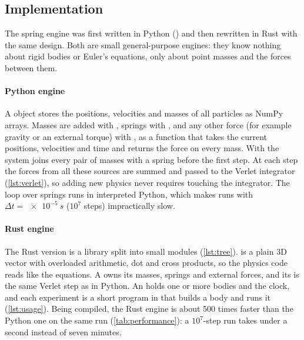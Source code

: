 \subsection{Implementation}
\label{sec:implementation}
\begin{sloppypar} %
The spring engine was first written in Python () and then rewritten in Rust with the same design.
Both are small general-purpose engines: they know nothing about rigid bodies or Euler's equations, only about point masses and the forces between them.

\paragraph{Python engine}
A  object stores the positions, velocities and masses of all particles as NumPy arrays.
Masses are added with , springs with , and any other force (for example gravity or an external torque) with , as a function that takes the current positions, velocities and time and returns the force on every mass.
With  the system joins every pair of masses with a spring before the first step.
At each step the forces from all these sources are summed and passed to the Verlet integrator (\cref{lst:verlet}), so adding new physics never requires touching the integrator.
The loop over springs runs in interpreted Python, which makes runs with $\Delta t=\SI{e-5}{s}$ ($10^7$ steps) impractically slow.
\end{sloppypar}

\paragraph{Rust engine}
The Rust version is a library split into small modules (\cref{lst:tree}).
 is a plain 3D vector with overloaded arithmetic, dot and cross products, so the physics code reads like the equations.
A  owns its masses, springs and external forces, and its  is the same Verlet step as in Python.
An  holds one or more bodies and the clock, and each experiment is a short program in  that builds a body and runs it (\cref{lst:usage}).
Being compiled, the Rust engine is about 500 times faster than the Python one on the same run (\cref{tab:performance}): a $10^7$-step run takes under a second instead of seven minutes.

